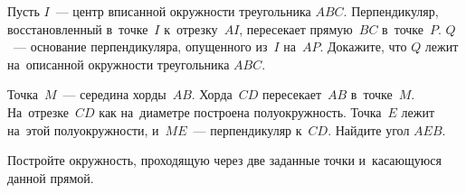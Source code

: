\begin{problems}
\item
Пусть $I$~--- центр вписанной окружности треугольника $ABC$.
Перпендикуляр, восстановленный в~точке~$I$ к~отрезку~$AI$, пересекает
прямую~$BC$ в~точке~$P$.
$Q$~--- основание перпендикуляра, опущенного из~$I$ на~$AP$.
Докажите, что $Q$ лежит на~описанной окружности треугольника $ABC$.

\item
Точка~$M$~--- середина хорды~$AB$.
Хорда~$CD$ пересекает~$AB$ в~точке~$M$.
На~отрезке~$CD$ как на~диаметре построена полуокружность.
Точка~$E$ лежит на~этой полуокружности, и~$ME$~--- перпендикуляр к~$CD$.
Найдите угол $AEB$.

\item
Постройте окружность, проходящую через две заданные точки и~касающуюся данной
прямой.

\end{problems}


